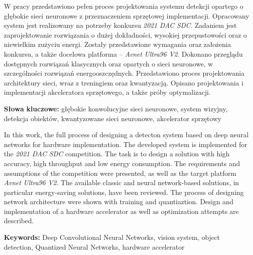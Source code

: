 \documentclass[12pt]{aghdpl}
\author{Michał Machura}
\date{2021}
\newenvironment{abstractpage}
{\cleardoublepage\vspace*{\fill}\thispagestyle{empty}}
{\vfill\cleardoublepage}
\renewenvironment{abstract}[1]
{\bigskip\selectlanguage{#1}%
    \begin{center}\bfseries\abstractname\end{center}}
{\par\bigskip}
\begin{document}
	\titlepages
	
	\begin{abstractpage}
    \begin{abstract}{polish}
        W pracy przedstawiono pełen proces projektowania systemu detekcji opartego o głębokie sieci neuronowe z przeznaczeniem sprzętowej implementacji.
        Opracowany system jest realizowany na potrzeby konkursu \emph{2021 DAC SDC}.
        Zadaniem jest zaprojektowanie rozwiązania o dużej dokładności, wysokiej przepustowości oraz o niewielkim zużyciu energi. 
        Zostały przedstawione wymagania oraz założenia konkursu, a także  docelowa platforma -- \emph{Avnet Ultra96 V2}. 
        Dokonano przeglądu dostępnych rozwiązań klasycznych oraz opartych o sieci neuronowe, w szczególności rozwiązań energooszczędnych. 
        Przedstawiono proces projektowania architektury sieci, wraz z treningiem oraz kwantyzacją. 
        Opisano projektowania i implementacji akceleratora sprzętowego, a także próby optymalizacji. 
        
        
        \bigskip
        \textbf{Słowa kluczowe:}   głębokie konwolucyjne sieci neuronowe, system wizyjny, detekcja obiektów, kwantyzowane sieci neuronowe, akcelerator sprzętowy
       
       
    \end{abstract}
    \bigskip
    \bigskip
    \bigskip
    \bigskip
    \bigskip
    \bigskip
    \bigskip
    \bigskip
    \bigskip
    \bigskip
    \bigskip
    \begin{abstract}{english}
        In this work, the full process of designing a detecton system based on deep neural networks for hardware implementation.
        The developed system is implemented for the \emph{2021 DAC SDC} competition.
        The task is to design a solution with high accuracy, high throughput and low energy consumption.
        The requirements and assumptions of the competition were presented, as well as the target platform \emph{Avnet Ultra96 V2}.
        The available classic and neural network-based solutions, in particular energy-saving solutions, have been reviewed.
        The process of designing network architecture were shown with training and quantiaztion.
        Design and implementation of a hardware accelerator as well as optimization attempts are described. 
        \bigskip
       
        \textbf{Keywords:} Deep Convolutional Neural Networks, vision system, object detection, Quantized Neural Networks, hardware accelerator
    \end{abstract}
\end{abstractpage}


	\RedefinePlainStyle
	
	\setcounter{tocdepth}{2}
	\tableofcontents
	\clearpage
	
	\newcommand{\round}[1]{\ensuremath{\lfloor#1\rceil}}
	
	
	
	
	
	
	
	

	
	\printbibliography
\end{document}
